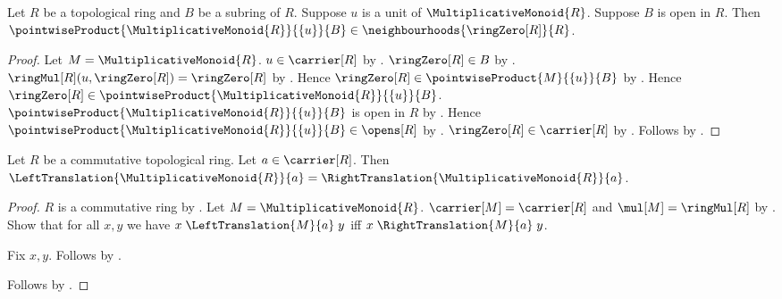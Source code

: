 \begin{corollary}\label{topological_ring_unit_left_multiple_subring_neighbourhood}
    Let $R$ be a topological ring and $B$ be a subring of $R$.
    Suppose $u$ is a unit of $\MultiplicativeMonoid{R}$.
    Suppose $B$ is open in $R$.
    Then $\pointwiseProduct{\MultiplicativeMonoid{R}}{\{u\}}{B}
        \in\neighbourhoods{\ringZero[R]}{R}$.
\end{corollary}
\begin{proof}
    Let $M=\MultiplicativeMonoid{R}$.
    $u\in\carrier[R]$ by
        .
    $\ringZero[R]\in B$ by
        .
    $\ringMul[R](u,\ringZero[R])=\ringZero[R]$ by
        .
    Hence $\ringZero[R]\in
        \pointwiseProduct{M}{\{u\}}{B}$ by
        .
    Hence $\ringZero[R]\in
        \pointwiseProduct{\MultiplicativeMonoid{R}}{\{u\}}{B}$.
    $\pointwiseProduct{\MultiplicativeMonoid{R}}{\{u\}}{B}$ is
        open in $R$ by .
    Hence $\pointwiseProduct{\MultiplicativeMonoid{R}}{\{u\}}{B}
        \in\opens[R]$ by .
    $\ringZero[R]\in\carrier[R]$ by .
    Follows by .
\end{proof}

\begin{proposition}\label{commutative_topological_ring_multiplication_maps_agree}
    Let $R$ be a commutative topological ring.
    Let $a\in\carrier[R]$.
    Then $\LeftTranslation{\MultiplicativeMonoid{R}}{a}
        =\RightTranslation{\MultiplicativeMonoid{R}}{a}$.
\end{proposition}
\begin{proof}
    $R$ is a commutative ring by
        .
    Let $M=\MultiplicativeMonoid{R}$.
    $\carrier[M]=\carrier[R]$ and $\mul[M]=\ringMul[R]$ by
        .
    Show that for all $x,y$ we have
        $x\mathrel{\LeftTranslation{M}{a}}y$ iff
        $x\mathrel{\RightTranslation{M}{a}}y$.
    \begin{subproof}
        Fix $x,y$.
        Follows by
            .
    \end{subproof}
    Follows by .
\end{proof}


